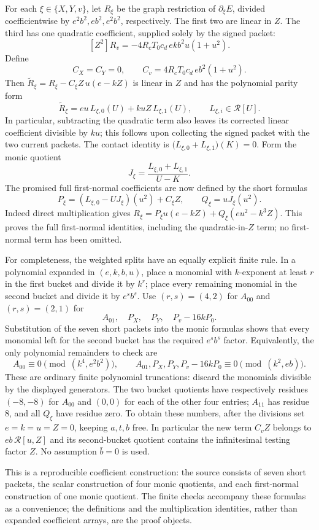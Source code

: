 For each $\xi\in\{X,Y,v\}$, let $R_\xi$ be the graph restriction of $\partial_\xi E$, divided coefficientwise by $e^2b^2,eb^2,e^2b^2$, respectively. The first two are linear in $Z$. The third has one quadratic coefficient, supplied solely by the signed packet:
\[
[Z^2]R_v=-4R_cT_0c_d\,e k b^2u(1+u^2).
\]
Define
\[
C_X=C_Y=0,\qquad C_v=4R_cT_0c_d\,eb^2(1+u^2).
\]
Then $\widetilde R_\xi=R_\xi-C_\xi Z\,u(e-kZ)$ is linear in $Z$ and has the polynomial parity form
\[
\widetilde R_\xi=eu\,L_{\xi,0}(U)+kuZ\,L_{\xi,1}(U),
\qquad L_{\xi,i}\in\mathcal R[U].
\]
In particular, subtracting the quadratic term also leaves its corrected linear coefficient divisible by $ku$; this follows upon collecting the signed packet with the two current packets. The contact identity is
$\big(L_{\xi,0}+L_{\xi,1}\big)(K)=0$. Form the monic quotient
\[
J_\xi=\frac{L_{\xi,0}+L_{\xi,1}}{U-K}.
\]
The promised full first-normal coefficients are now defined by the short formulas
\[
P_\xi=(L_{\xi,0}-UJ_\xi)(u^2)+C_\xi Z,
\qquad Q_\xi=uJ_\xi(u^2).
\]
Indeed direct multiplication gives
$R_\xi=P_\xi u(e-kZ)+Q_\xi(eu^2-k^3Z)$.
This proves the full first-normal identities, including the quadratic-in-$Z$ term; no first-normal term has been omitted.

For completeness, the weighted splits have an equally explicit finite rule. In a polynomial expanded in $(e,k,b,u)$, place a monomial with $k$-exponent at least $r$ in the first bucket and divide it by $k^r$; place every remaining monomial in the second bucket and divide it by $e^s b^s$. Use $(r,s)=(4,2)$ for $A_{00}$ and $(r,s)=(2,1)$ for
\[
A_{01},\quad P_X,\quad P_Y,\quad P_v-16kP_0.
\]
Substitution of the seven short packets into the monic formulas shows that every monomial left for the second bucket has the required $e^s b^s$ factor. Equivalently, the only polynomial remainders to check are
\[
A_{00}\equiv0\pmod{(k^4,e^2b^2)},\qquad
A_{01},P_X,P_Y,P_v-16kP_0\equiv0\pmod{(k^2,eb)}.
\]
These are ordinary finite polynomial truncations: discard the monomials divisible by the displayed generators. The two bucket quotients have respectively residues $(-8,-8)$ for $A_{00}$ and $(0,0)$ for each of the other four entries; $A_{11}$ has residue $8$, and all $Q_\xi$ have residue zero. To obtain these numbers, after the divisions set $e=k=u=Z=0$, keeping $a,t,b$ free. In particular the new term $C_vZ$ belongs to $eb\,\mathcal R[u,Z]$ and its second-bucket quotient contains the infinitesimal testing factor $Z$. No assumption $\bar b=0$ is used.

This is a reproducible coefficient construction: the source consists of seven short packets, the scalar construction of four monic quotients, and each first-normal construction of one monic quotient. The finite checks accompany these formulas as a convenience; the definitions and the multiplication identities, rather than expanded coefficient arrays, are the proof objects.
